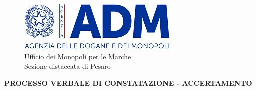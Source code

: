 \documentclass[12pt]{article}
\begin{document}
\thispagestyle{empty}

\begin{figure}[h]
    \centering
    \includegraphics{logo-adm.jpg}
    \caption*{Ufficio dei Monopoli per le Marche\\Sezione distaccata di Pesaro}
    \label{fig:logoadm}
\end{figure}

{\centering
    \textbf{PROCESSO VERBALE DI CONSTATAZIONE - ACCERTAMENTO}
    \par
}
\end{document}
